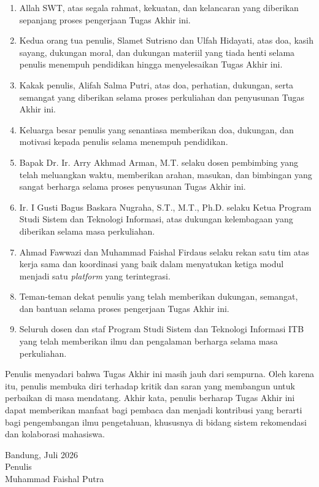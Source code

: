 \begin{enumerate}
    \item Allah SWT, atas segala rahmat, kekuatan, dan kelancaran yang diberikan sepanjang proses pengerjaan Tugas Akhir ini.

    \item Kedua orang tua penulis, Slamet Sutrisno dan Ulfah Hidayati, atas doa, kasih sayang, dukungan moral, dan dukungan materiil yang tiada henti selama penulis menempuh pendidikan hingga menyelesaikan Tugas Akhir ini.

    \item Kakak penulis, Alifah Salma Putri, atas doa, perhatian, dukungan, serta semangat yang diberikan selama proses perkuliahan dan penyusunan Tugas Akhir ini.

    \item Keluarga besar penulis yang senantiasa memberikan doa, dukungan, dan motivasi kepada penulis selama menempuh pendidikan.

    \item Bapak Dr. Ir. Arry Akhmad Arman, M.T. selaku dosen pembimbing yang telah meluangkan waktu, memberikan arahan, masukan, dan bimbingan yang sangat berharga selama proses penyusunan Tugas Akhir ini.

    \item Ir. I Gusti Bagus Baskara Nugraha, S.T., M.T., Ph.D. selaku Ketua Program Studi Sistem dan Teknologi Informasi, atas dukungan kelembagaan yang diberikan selama masa perkuliahan.

    \item Ahmad Fawwazi dan Muhammad Faishal Firdaus selaku rekan satu tim atas kerja sama dan koordinasi yang baik dalam menyatukan ketiga modul menjadi satu \emph{platform} yang terintegrasi.

    \item Teman-teman dekat penulis yang telah memberikan dukungan, semangat, dan bantuan selama proses pengerjaan Tugas Akhir ini.

    \item Seluruh dosen dan staf Program Studi Sistem dan Teknologi Informasi ITB yang telah memberikan ilmu dan pengalaman berharga selama masa perkuliahan.
\end{enumerate}

Penulis menyadari bahwa Tugas Akhir ini masih jauh dari sempurna. Oleh karena itu, penulis membuka diri terhadap kritik dan saran yang membangun untuk perbaikan di masa mendatang. Akhir kata, penulis berharap Tugas Akhir ini dapat memberikan manfaat bagi pembaca dan menjadi kontribusi yang berarti bagi pengembangan ilmu pengetahuan, khususnya di bidang sistem rekomendasi dan kolaborasi mahasiswa.

\begin{flushright}
    Bandung, Juli 2026\\

    Penulis \\
    \vspace{1cm}
    Muhammad Faishal Putra
\end{flushright}
